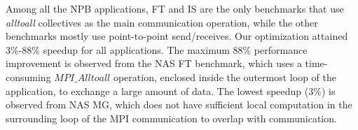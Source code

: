 Among all the NPB applications, FT and IS are the only benchmarks that use {\em alltoall} collectives as the main communication operation, while the other benchmarks mostly use point-to-point send/receives.
Our optimization attained 3\%-88\% speedup for all applications.
The maximum 88\% performance improvement is observed from the NAS FT benchmark, which uses a time-consuming $MPI\_Alltoall$ operation, enclosed inside the outermost loop of the application,  to exchange a large amount of data.
The lowest speedup (3\%) is observed from NAS MG, which does not have sufficient local computation in the surrounding loop of the MPI communication to overlap with communication.




